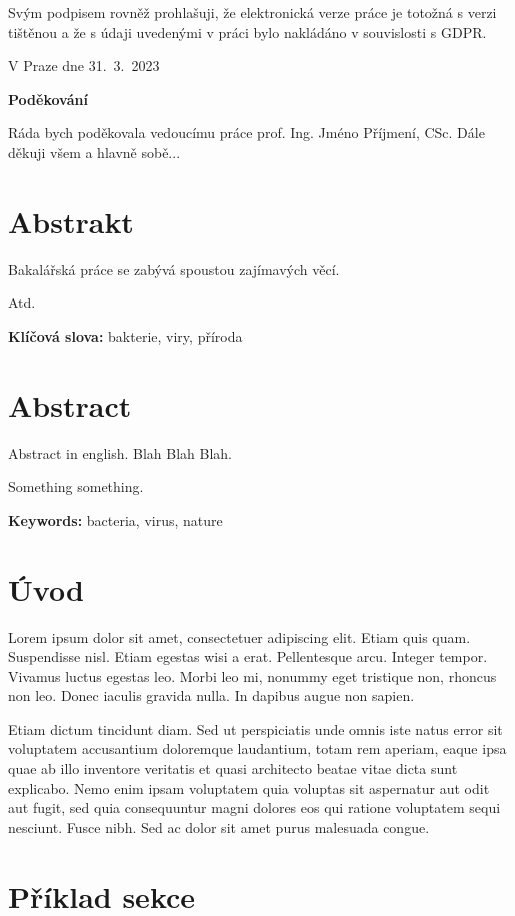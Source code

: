 \documentclass[a4paper, 12pt, oneside]{article}
\begin{document}
Svým podpisem rovněž prohlašuji, že elektronická verze práce je totožná s verzi tištěnou a že 
s údaji uvedenými v práci bylo nakládáno v souvislosti s GDPR.

\vspace{2cm}
V Praze dne 31.~3.~2023
\newpage

\mbox{}
\vfill
{\normalfont\sffamily\Large\bfseries\color{fzp_main}\selectfont Poděkování}

Ráda bych poděkovala vedoucímu práce prof. Ing. Jméno Příjmení, CSc. 
Dále děkuji všem a hlavně sobě...


\section*{Abstrakt}
Bakalářská práce se zabývá spoustou zajímavých věcí.

Atd.

\noindent\textbf{Klíčová slova:} bakterie, viry, příroda

\section*{Abstract}
Abstract in english. Blah Blah Blah.

Something something.

\noindent\textbf{Keywords:} bacteria, virus, nature

\tableofcontents

\section{Úvod}
 Lorem ipsum dolor sit amet, consectetuer adipiscing elit. Etiam quis quam. Suspendisse nisl. Etiam egestas wisi a erat. Pellentesque arcu. Integer tempor. Vivamus luctus egestas leo. Morbi leo mi, nonummy eget tristique non, rhoncus non leo. Donec iaculis gravida nulla. In dapibus augue non sapien.
 
 Etiam dictum tincidunt diam. Sed ut perspiciatis unde omnis iste natus error sit voluptatem accusantium doloremque laudantium, totam rem aperiam, eaque ipsa quae ab illo inventore veritatis et quasi architecto beatae vitae dicta sunt explicabo. Nemo enim ipsam voluptatem quia voluptas sit aspernatur aut odit aut fugit, sed quia consequuntur magni dolores eos qui ratione voluptatem sequi nesciunt. Fusce nibh. Sed ac dolor sit amet purus malesuada congue.

\section{Příklad sekce}
\end{document}
